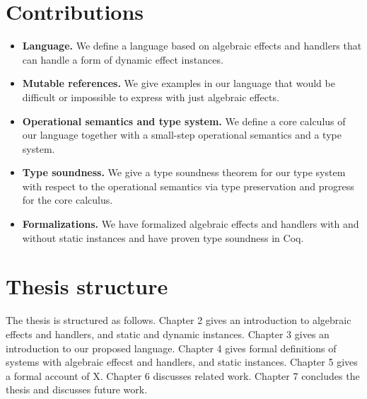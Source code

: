 \section*{Contributions}
\begin{itemize}

\item \textbf{Language.}
We define a language based on algebraic effects and handlers that can handle a form of dynamic effect instances.

\item \textbf{Mutable references.}
We give examples in our language that would be difficult or impossible to express with just algebraic effects.

\item \textbf{Operational semantics and type system.}
We define a core calculus of our language together with a small-step operational semantics and a type system.

\item \textbf{Type soundness.}
We give a type soundness theorem for our type system with respect to the operational semantics via type preservation and progress for the core calculus.

\item \textbf{Formalizations.}
We have formalized algebraic effects and handlers with and without static instances and have proven type soundness in Coq.

\end{itemize}

\section*{Thesis structure}
The thesis is structured as follows.
Chapter 2 gives an introduction to algebraic effects and handlers, and static and dynamic instances.
Chapter 3 gives an introduction to our proposed language.
Chapter 4 gives formal definitions of systems with algebraic effecst and handlers, and static instances.
Chapter 5 gives a formal account of X.
Chapter 6 discusses related work.
Chapter 7 concludes the thesis and discusses future work.
